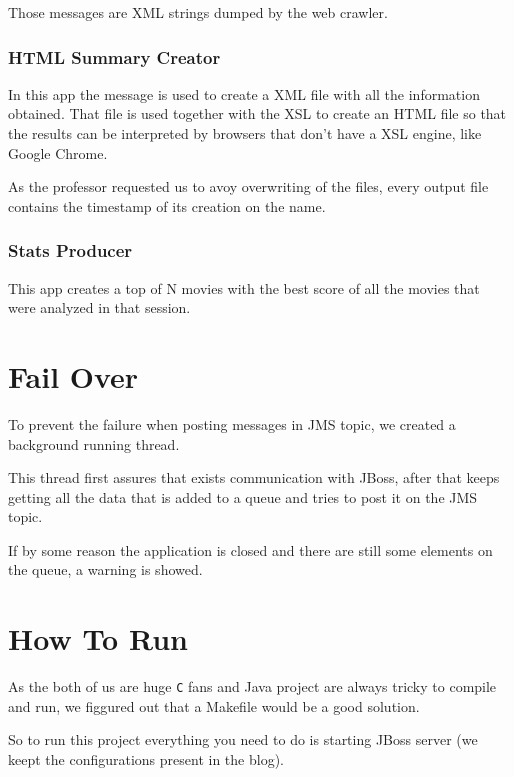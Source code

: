 \documentclass[a4paper]{article}
\begin{document}
Those messages are XML strings dumped by the web crawler.
\subsubsection{HTML Summary Creator}
\indent \indent In this app the message is used to create a XML file with all the information obtained. That file is used together with the XSL to create an HTML file so that the results can be interpreted by browsers that don't have a XSL engine, like Google Chrome.

As the professor requested us to avoy overwriting of the files, every output file contains the timestamp of its creation on the name.

\subsubsection{Stats Producer}
\indent \indent This app creates a top of N movies with the best score of all the movies that were analyzed in that session.

\section{Fail Over}
\indent \indent To prevent the failure when posting messages in JMS topic, we created a background running thread.

This thread first assures that exists communication with JBoss, after that keeps getting all the data that is added to a queue and tries to post it on the JMS topic.

If by some reason the application is closed and there are still some elements on the queue, a warning is showed.

\section{How To Run}
\indent \indent As the both of us are huge \texttt{C} fans and Java project are always tricky to compile and run, we figgured out that a Makefile would be a good solution.

So to run this project everything you need to do is starting JBoss server (we keept the configurations present in the blog).
\end{document}
